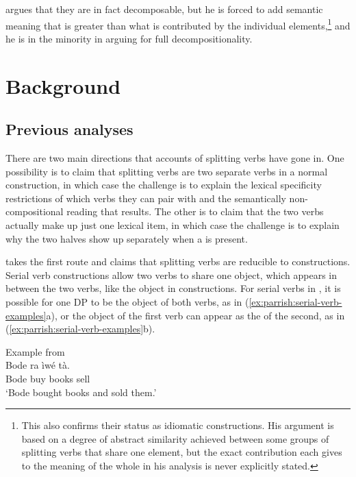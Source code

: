 \documentclass[output=paper]{LSP/langsci}
\begin{document}
\citet{Awoyale1974} argues that they are in fact decomposable, but he is forced to add semantic meaning that is greater than what is contributed by the individual elements,\footnote{This also confirms their status as idiomatic constructions. His argument is based on a degree of abstract similarity achieved between some groups of splitting verbs that share one element, but the exact contribution each gives to the meaning of the whole in his analysis is never explicitly stated.} and he is in the minority in arguing for full decompositionality. 



\section{Background}
\label{sect:background}
\subsection{Previous analyses}
\label{sect:yoruba}

There are two main directions that accounts of splitting verbs have gone in. One possibility is to claim that splitting verbs are two separate verbs in a normal  construction, in which case the challenge is to explain the lexical specificity restrictions of which verbs they can pair with and the semantically non-compositional reading that results. The other is to claim that the two verbs actually make up just one lexical item, in which case the challenge is to explain why the two halves show up separately when a  is present. 

\citet{Bamgbose1966} takes the first route and claims that splitting verbs are reducible to  constructions. Serial verb constructions allow two verbs to share one object, which appears in between the two verbs, like the object in  constructions. For serial verbs in , it is possible for one DP to be the object of both verbs, as in (\ref{ex:parrish:serial-verb-examples}a), or the object of the first verb can appear as the  of the second, as in (\ref{ex:parrish:serial-verb-examples}b). 


\ea
 \ea Example from \citet{Bode2007} \\
    \gll Bode ra \`{i}w\'{e} t\`{a}.\\
    Bode buy books sell\\
    \glt `Bode bought books and sold them.'
\end{document}
